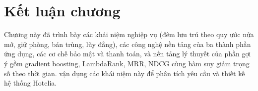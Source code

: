 \section{Kết luận chương}

Chương này đã trình bày các khái niệm nghiệp vụ (đêm lưu trú theo quy ước nửa mở, giữ phòng, bán trùng, lũy đẳng), các công nghệ nền tảng của ba thành phần ứng dụng, các cơ chế bảo mật và thanh toán, và nền tảng lý thuyết của phần gợi ý gồm gradient boosting, LambdaRank, MRR, NDCG cùng hàm suy giảm trọng số theo thời gian.  vận dụng các khái niệm này để phân tích yêu cầu và thiết kế hệ thống Hotelia.
